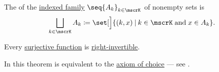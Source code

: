 \begin{definition}\label{def:disjoint_union}
  The  of the \hyperref[def:tuple_and_cartesian_product/indexed_family]{indexed family} \( \seq{ A_k }_{k \in \mscrK} \) of nonempty sets is
  \begin{equation*}
    \bigsqcup_{k \in \mscrK} A_k \coloneqq \set[\Big]{ (k, x) \given k \in \mscrK \T{and} x \in A_k }.
  \end{equation*}
\end{definition}

\begin{theorem}\label{thm:surjective_functions_are_right_invertible}
  Every \hyperref[def:function_invertibility/surjective]{surjective function} is \hyperref[def:morphism_invertibility/right_invertible]{right-invertible}.

  In \hyperref[def:zfc]{} this theorem is equivalent to the \hyperref[def:zfc/choice]{axiom of choice} --- see .
\end{theorem}
